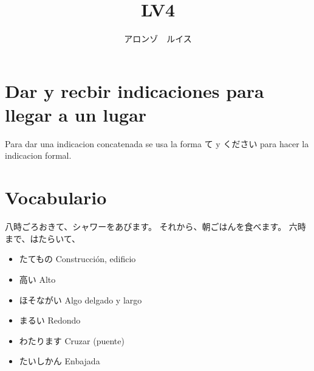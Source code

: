 \documentclass[a4paper,lualatex,ja=standard,base=10pt]{bxjsarticle}
\title{\ruby{第|０６|課}{だい||か} LV4}
\author{アロンゾ　ルイス}
\begin{document}
\setcounter{page}{1}

\maketitle{}
\thispagestyle{fancy}

\section{Dar y recbir indicaciones para llegar a un lugar}

Para dar una indicacion concatenada se usa la forma て y ください para hacer la indicacion formal.

\section{Vocabulario}

八時ごろおきて、シャワーをあびます。
それから、朝ごはんを食べます。
六時まで、はたらいて、


\begin{itemize}
  \item たてもの Construcción, edificio
  \item 高い Alto
  \item ほそながい Algo delgado y largo
  \item まるい Redondo
  \item わたります Cruzar (puente)
  \item たいしかん Enbajada
\end{itemize}
\end{document}
